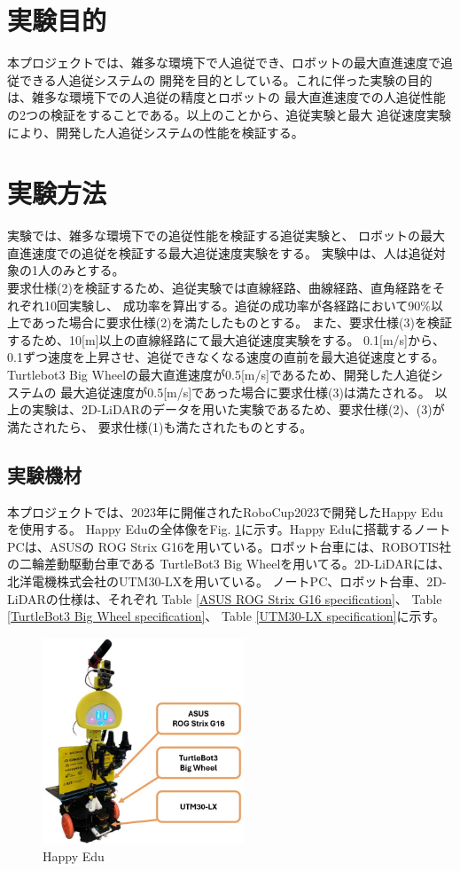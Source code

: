 \section{実験目的}
本プロジェクトでは、雑多な環境下で人追従でき、ロボットの最大直進速度で追従できる人追従システムの
開発を目的としている。これに伴った実験の目的は、雑多な環境下での人追従の精度とロボットの
最大直進速度での人追従性能の2つの検証をすることである。以上のことから、追従実験と最大
追従速度実験により、開発した人追従システムの性能を検証する。

\section{実験方法}
実験では、雑多な環境下での追従性能を検証する追従実験と、
ロボットの最大直進速度での追従を検証する最大追従速度実験をする。
実験中は、人は追従対象の1人のみとする。\\ \indent
要求仕様(2)を検証するため、追従実験では直線経路、曲線経路、直角経路をそれぞれ10回実験し、
成功率を算出する。追従の成功率が各経路において90\%以上であった場合に要求仕様(2)を満たしたものとする。
また、要求仕様(3)を検証するため、10[m]以上の直線経路にて最大追従速度実験をする。
0.1[m/s]から、0.1ずつ速度を上昇させ、追従できなくなる速度の直前を最大追従速度とする。
Turtlebot3 Big Wheelの最大直進速度が0.5[m/s]であるため、開発した人追従システムの
最大追従速度が0.5[m/s]であった場合に要求仕様(3)は満たされる。
以上の実験は、2D-LiDARのデータを用いた実験であるため、要求仕様(2)、(3)が満たされたら、
要求仕様(1)も満たされたものとする。

\subsection{実験機材}
本プロジェクトでは、2023年に開催されたRoboCup2023で開発したHappy Eduを使用する。
Happy Eduの全体像をFig. \ref{Happy Edu}に示す。Happy Eduに搭載するノートPCは、ASUSの
ROG Strix G16を用いている。ロボット台車には、ROBOTIS社の二輪差動駆動台車である
TurtleBot3 Big Wheelを用いてる。2D-LiDARには、北洋電機株式会社のUTM30-LXを用いている。
ノートPC、ロボット台車、2D-LiDARの仕様は、それぞれ
Table \ref{ASUS ROG Strix G16 specification}、
Table \ref{TurtleBot3 Big Wheel specification}、
Table \ref{UTM30-LX specification}に示す。

\begin{figure}[h]
  \begin{center}
  \includegraphics[width=60mm,clip]{figure/Happy_Edu.jpg}
  \caption{Happy Edu}
  \label{Happy Edu}
  \end{center}
\end{figure}

